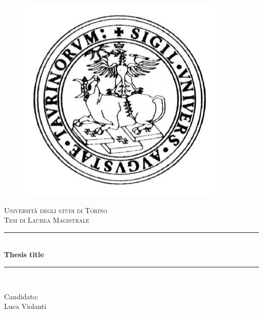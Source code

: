 \documentclass[a4paper, 11pt, oneside]{elsarticle}
\newcommand{\HRule}{\rule{\linewidth}{0.5mm}}
\begin{document}
\begin{titlepage}
\begin{center}

\begin{figure}[htp]
\centering
\includegraphics[scale=0.25]{img/logo_unito.png}
\label{}
\end{figure}

\textsc{\LARGE Università degli studi di Torino}\\[2cm]
\textsc{\Large Tesi di Laurea Magistrale}\\[2cm]

\HRule \\[0.4cm]
{ \huge \bfseries Thesis title}\\[0.2cm]
\HRule \\[3cm]

\begin{flushleft}
{\Large
Candidato:\\[0.5cm]
Luca Violanti}
\end{flushleft}

\end{center}
\end{titlepage}


\begin{abstract}
\end{abstract}
\end{document}

